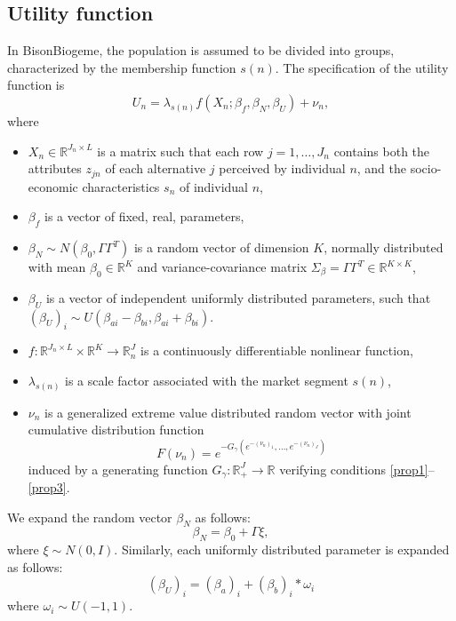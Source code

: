 \documentclass[12pt]{memoir}
\begin{document}
 \subsection{Utility function}
  In BisonBiogeme, the population is assumed to be divided into groups, characterized by
  the membership function $s(n)$.  The specification of the utility
  function is 
      \begin{equation}
      \label{eq:Un1}
       U_{n} = \lambda_{s(n)} f(X_{n};\beta_f,\beta_N,\beta_U) + \nu_{n},
      \end{equation}
      where
      \begin{itemize}
         \item $X_{n} \in \mathbb{R}^{J_n \times L}$ is a matrix such that each
            row $j=1,\ldots,J_n$ contains both the attributes $z_{jn}$
            of each alternative $j$
            perceived by individual $n$, and the socio-economic
            characteristics $s_n$ of individual
            $n$,
\item $\beta_f$ is a vector of fixed, real, parameters,
         \item $\beta_N\sim N(\beta_0,\Gamma \Gamma^T)$ is a random vector of dimension $K$, normally
            distributed with mean $\beta_0 \in \mathbb{R}^K$ and variance-covariance matrix
            $\Sigma_\beta = \Gamma \Gamma^T \in \mathbb{R}^{K\times K}$,
        \item $\beta_U$ is a vector of independent uniformly distributed parameters, such that $(\beta_U)_i \sim U(\beta_{ai}-\beta_{bi},\beta_{ai}+\beta_{bi})$.
         \item $f:\mathbb{R}^{J_n \times L} \times \mathbb{R}^K \rightarrow
            \mathbb{R}^J_n$ is a continuously differentiable nonlinear function,
         \item $\lambda_{s(n)}$ is a scale factor associated with the market
            segment $s(n)$, 
         \item $\nu_n$ is a generalized extreme value distributed random
            vector with joint cumulative  distribution function 
            \begin{equation}
            F(\nu_n) = e^{-G_\gamma(e^{-(\nu_{n})_1},\ldots,e^{-(\nu_{n})_{J}} )}
            \end{equation}
            induced by a generating function
              $G_\gamma:\mathbb{R}_+^J\rightarrow\mathbb{R}$ verifying conditions
              \ref{prop1}--\ref{prop3}.
      \end{itemize}
      We  expand the random vector $\beta_N$ as follows:
      \begin{equation}
      \beta_N = \beta_0 + \Gamma \xi,
      \end{equation}
      where $\xi\sim N(0,I)$. 
        Similarly, each uniformly distributed parameter is expanded as follows:
\begin{equation}
(\beta_U)_i = (\beta_a)_i + (\beta_b)_i * \omega_i
\end{equation}
        where $\omega_i \sim U(-1,1)$.
\end{document}
